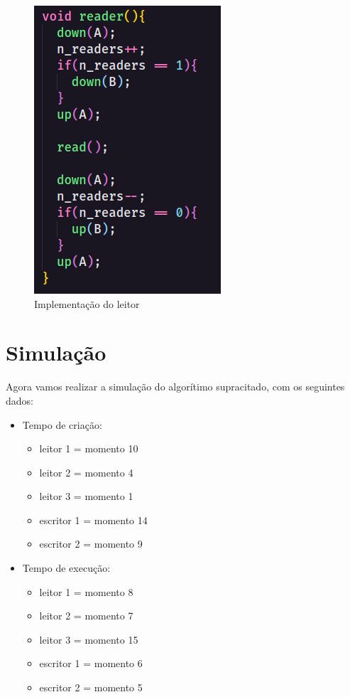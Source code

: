\documentclass[12pt, a4paper]{article}
\begin{document}
\clearpage

\begin{figure}[!htb]
	\centering
	\caption{\label{fig:4.png}Implementação do leitor}
	\includegraphics[keepaspectratio]{4.png}
\end{figure}


\section{Simulação}

Agora vamos realizar a simulação do algorítimo supracitado, com os seguintes dados:

\begin{itemize}
	\item Tempo de criação:
	\begin{itemize}
			\item leitor 1 = momento 10
			\item leitor 2 = momento 4
			\item leitor 3 = momento 1
			\item escritor 1 = momento 14
			\item escritor 2 = momento 9
	\end{itemize}
	\clearpage
	\item Tempo de execução:
		\begin{itemize}
			\item leitor 1 = momento 8
			\item leitor 2 = momento 7
			\item leitor 3 = momento 15
			\item escritor 1 = momento 6
			\item escritor 2 = momento 5
		\end{itemize}
\end{itemize}
	 
\end{document}
